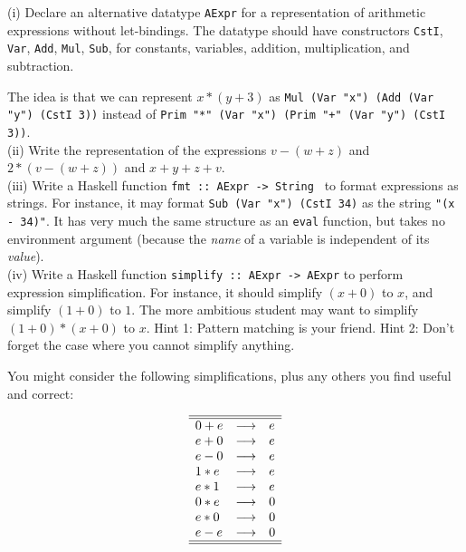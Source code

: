 \documentclass[a4paper]{article}
\begin{document}
\begin{exercise}\label{exer-aexpr-datatype}
  (i) Declare an alternative datatype \texttt{AExpr} for a
representation of arithmetic expressions without let-bindings.  The
datatype should have constructors \texttt{CstI}, \texttt{Var},
\texttt{Add}, \texttt{Mul}, \texttt{Sub}, for constants, variables,
addition, multiplication, and subtraction.
  
The idea is that we can represent $x*(y+3)$ as \texttt{Mul (Var "x")
  (Add (Var "y") (CstI 3))} instead of \texttt{Prim "*" (Var "x")
  (Prim "+" (Var "y") (CstI 3))}.\\

\noindent
(ii) Write the representation of the expressions $v-(w+z)$ and
$2*(v-(w+z))$ and $x+y+z+v$.\\

\noindent
(iii) Write a Haskell function \texttt{fmt ::\ AExpr -> String } to format
expressions as strings.  For instance, it may format \texttt{Sub (Var
  "x") (CstI 34)} as the string \texttt{"(x - 34)"}.  It has very much
the same structure as an \texttt{eval} function, but takes no
environment argument (because the \emph{name} of a variable is
independent of its \emph{value}).\\

\noindent
(iv) Write a Haskell function \texttt{simplify ::\ AExpr -> AExpr} to
perform expression simplification.  For instance, it should simplify
$(x+0)$ to $x$, and simplify $(1+0)$ to $1$.  The more ambitious
student may want to simplify $(1+0)*(x+0)$ to $x$.  Hint 1: Pattern
matching is your friend.  Hint 2: Don't forget the case where you
cannot simplify anything.

You might consider the following simplifications, plus any others you
find useful and correct:

\begin{displaymath}
  \begin{array}{lcl}\hline\hline
    0 + e & \longrightarrow & e\\
    e + 0 & \longrightarrow & e\\
    e - 0 & \longrightarrow & e\\
    1 * e & \longrightarrow & e\\
    e * 1 & \longrightarrow & e\\
    0 * e & \longrightarrow & 0\\
    e * 0 & \longrightarrow & 0\\
    e - e & \longrightarrow & 0\\\hline\hline
  \end{array}
\end{displaymath}

\end{exercise}
\end{document}
